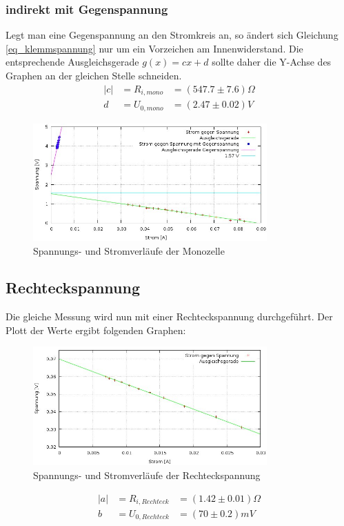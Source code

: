 \subsubsection{indirekt mit Gegenspannung}
Legt man eine Gegenspannung an den Stromkreis an, so ändert sich Gleichung \eqref{eq_klemmspannung} nur um ein Vorzeichen am Innenwiderstand. Die entsprechende Ausgleichsgerade $g(x)=cx +d$ sollte daher die Y-Achse des Graphen an der gleichen Stelle schneiden.
\begin{align*}
|c| &= R_{i,mono} &= (547.7    \pm 7.6) \Omega\\
d &= U_{0, mono} &= (2.47   \pm 0.02) V
\end{align*}
\begin{figure}[htbp]
\includegraphics[width=0.8\textwidth]{pics/konst_beide.jpeg}
\caption{Spannungs- und Stromverläufe der Monozelle}
\end{figure}

\subsection{Rechteckspannung}
Die gleiche Messung wird nun mit einer Rechteckspannung durchgeführt. Der Plott der Werte ergibt folgenden Graphen:
\begin{figure}[htbp]
\includegraphics[width=0.8\textwidth]{pics/rechteck.jpeg}
\caption{Spannungs- und Stromverläufe der Rechteckspannung}
\end{figure}
\begin{align*}
|a| &= R_{i,Rechteck}               &= (1.42  \pm 0.01) \Omega\\
b &= U_{0, Rechteck} &= (70  \pm 0.2) mV
\end{align*}

